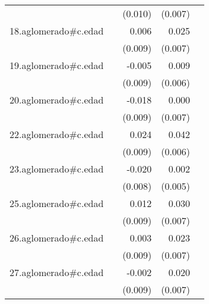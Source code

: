 {\begin{longtable}{l*{4}{D{.}{.}{-1}}}
            &                     &     (0.010)         &     (0.007)         &                     \\
\addlinespace
18.aglomerado#c.edad&                     &       0.006         &       0.025\sym{***}&                     \\
            &                     &     (0.009)         &     (0.007)         &                     \\
\addlinespace
19.aglomerado#c.edad&                     &      -0.005         &       0.009         &                     \\
            &                     &     (0.009)         &     (0.006)         &                     \\
\addlinespace
20.aglomerado#c.edad&                     &      -0.018\sym{*}  &       0.000         &                     \\
            &                     &     (0.009)         &     (0.007)         &                     \\
\addlinespace
22.aglomerado#c.edad&                     &       0.024\sym{**} &       0.042\sym{***}&                     \\
            &                     &     (0.009)         &     (0.006)         &                     \\
\addlinespace
23.aglomerado#c.edad&                     &      -0.020\sym{*}  &       0.002         &                     \\
            &                     &     (0.008)         &     (0.005)         &                     \\
\addlinespace
25.aglomerado#c.edad&                     &       0.012         &       0.030\sym{***}&                     \\
            &                     &     (0.009)         &     (0.007)         &                     \\
\addlinespace
26.aglomerado#c.edad&                     &       0.003         &       0.023\sym{***}&                     \\
            &                     &     (0.009)         &     (0.007)         &                     \\
\addlinespace
27.aglomerado#c.edad&                     &      -0.002         &       0.020\sym{**} &                     \\
            &                     &     (0.009)         &     (0.007)         &                     \\

\end{longtable}}
